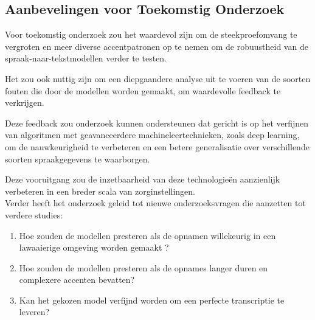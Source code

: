 \subsection{Aanbevelingen voor Toekomstig Onderzoek}

Voor toekomstig onderzoek zou het waardevol zijn om de steekproefomvang te vergroten en meer diverse accentpatronen op te nemen om de robuustheid van de spraak-naar-tekstmodellen verder te testen.

 Het zou ook nuttig zijn om een diepgaandere analyse uit te voeren van de soorten fouten die door de modellen worden gemaakt, om waardevolle feedback te verkrijgen. 
 
 Deze feedback zou onderzoek kunnen ondersteunen dat gericht is op het verfijnen van algoritmen met geavanceerdere machineleertechnieken, zoals deep learning, om de nauwkeurigheid te verbeteren en een betere generalisatie over verschillende soorten spraakgegevens te waarborgen. 
 
 Deze vooruitgang zou de inzetbaarheid van deze technologieën aanzienlijk verbeteren in een breder scala van zorginstellingen.
\\
Verder heeft het onderzoek geleid tot nieuwe onderzoeksvragen die aanzetten tot verdere studies:





\begin{enumerate}[label=\arabic*.]
    
    \item Hoe zouden de modellen presteren als de opnamen willekeurig in een lawaaierige omgeving worden gemaakt ?
    \item Hoe zouden de modellen presteren als de opnames langer duren en complexere accenten bevatten?
    \item Kan het gekozen model verfijnd worden om een perfecte transcriptie te leveren?
    
\end{enumerate}



